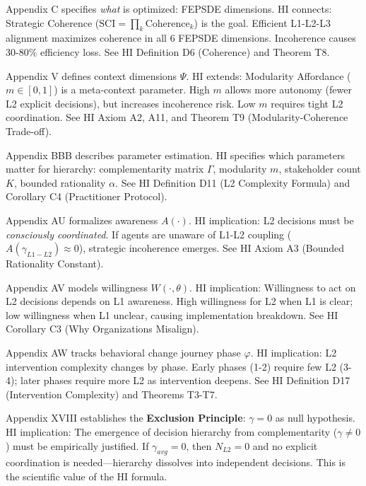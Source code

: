 \begin{tcolorbox}[colback=white, colframe=black,
    title=\textbf{9C Integration: How HI CORE-HIERARCHY Connects to Other COREs}]
\begin{description}[style=nextline, labelindent=0pt, leftmargin=1.5cm]
\item[\textbf{C (CORE-WHAT)}]
Appendix C specifies \textit{what} is optimized: FEPSDE dimensions. HI connects: Strategic Coherence ($\text{SCI} = \prod_k \text{Coherence}_k$) is the goal. Efficient L1-L2-L3 alignment maximizes coherence in all 6 FEPSDE dimensions. Incoherence causes 30-80\% efficiency loss. See HI Definition D6 (Coherence) and Theorem T8.

\item[\textbf{V (CORE-WHEN)}]
Appendix V defines context dimensions $\Psi$. HI extends: Modularity Affordance ($m \in [0,1]$) is a meta-context parameter. High $m$ allows more autonomy (fewer L2 explicit decisions), but increases incoherence risk. Low $m$ requires tight L2 coordination. See HI Axiom A2, A11, and Theorem T9 (Modularity-Coherence Trade-off).

\item[\textbf{BBB (CORE-WHERE)}]
Appendix BBB describes parameter estimation. HI specifies which parameters matter for hierarchy: complementarity matrix $\Gamma$, modularity $m$, stakeholder count $K$, bounded rationality $\alpha$. See HI Definition D11 (L2 Complexity Formula) and Corollary C4 (Practitioner Protocol).

\item[\textbf{AU (CORE-AWARE)}]
Appendix AU formalizes awareness $A(\cdot)$. HI implication: L2 decisions must be \textit{consciously coordinated}. If agents are unaware of L1-L2 coupling ($A(\gamma_{L1-L2}) \approx 0$), strategic incoherence emerges. See HI Axiom A3 (Bounded Rationality Constant).

\item[\textbf{AV (CORE-READY)}]
Appendix AV models willingness $W(\cdot, \theta)$. HI implication: Willingness to act on L2 decisions depends on L1 awareness. High willingness for L2 when L1 is clear; low willingness when L1 unclear, causing implementation breakdown. See HI Corollary C3 (Why Organizations Misalign).

\item[\textbf{AW (CORE-STAGE)}]
Appendix AW tracks behavioral change journey phase $\varphi$. HI implication: L2 intervention complexity changes by phase. Early phases (1-2) require few L2 (3-4); later phases require more L2 as intervention deepens. See HI Definition D17 (Intervention Complexity) and Theorems T3-T7.

\item[\textbf{XVIII (LIT-FEHR-METHOD)}]
Appendix XVIII establishes the \textbf{Exclusion Principle}: $\gamma = 0$ as null hypothesis. HI implication: The emergence of decision hierarchy from complementarity ($\gamma \neq 0$) must be empirically justified. If $\gamma_{avg} = 0$, then $N_{L2} = 0$ and no explicit coordination is needed---hierarchy dissolves into independent decisions. This is the scientific value of the HI formula.


\end{description}
\end{tcolorbox}
